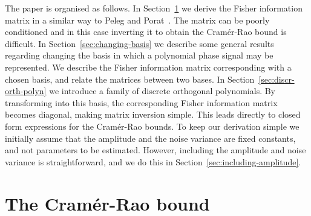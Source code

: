 \documentclass[review]{elsarticle}
\begin{document}

The paper is organised as follows.  In Section~\ref{sec_crb} we derive the Fisher information matrix in a similar way to Peleg and Porat~\cite{Peleg1991_CRB_PPS_1991}.  The matrix can be poorly conditioned and in this case inverting it to obtain the Cram\'{e}r-Rao bound is difficult.  In Section~\ref{sec:changing-basis} we describe some general results regarding changing the basis in which a polynomial phase signal may be represented.  We describe the Fisher information matrix corresponding with a chosen basis, and relate the matrices between two bases.  In Section~\ref{sec:discr-orth-polyn} we introduce a family of discrete orthogonal polynomials.  By transforming into this basis, the corresponding Fisher information matrix becomes diagonal, making matrix inversion simple.  This leads directly to closed form expressions for the Cram\'{e}r-Rao bounds.  %
To keep our derivation simple we initially assume that the amplitude and the noise variance are fixed constants, and not parameters to be estimated.  However, including the amplitude and noise variance is straightforward, and we do this in Section~\ref{sec:including-amplitude}.  


\section{The Cram\'{e}r-Rao bound} \label{sec_crb}
\end{document}

